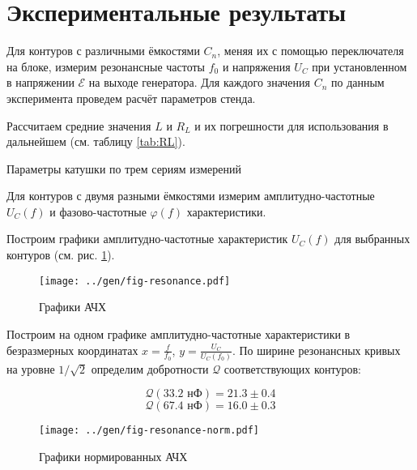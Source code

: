 \section*{Экспериментальные результаты}

Для контуров с различными ёмкостями $C_n$, меняя их с помощью переключателя на блоке, измерим резонансные частоты $f_0$ и напряжения $U_C$ при установленном в напряжении $\mathscr{E}$ на выходе генератора. Для каждого значения $C_n$ по данным эксперимента проведем расчёт параметров стенда.

Рассчитаем средние значения $L$ и $R_L$ и их погрешности для использования в дальнейшем (см. таблицу \ref{tab:RL}).

%	

\begin{table}[H]
	\centering
	\footnotesize

	
	
	
	
	
	
	\caption{Параметры катушки по трем сериям измерений}
	\label{tab:RL}
\end{table}

Для контуров с двумя разными ёмкостями измерим амплитудно-частотные $U_C(f)$ и  фазово-частотные $\varphi(f)$ характеристики.

Построим графики амплитудно-частотные характеристик $U_C(f)$ для выбранных контуров (см. рис. \ref{fig:resonance}).

\begin{figure}[h]
	\centering
	\texttt{[image: ../gen/fig-resonance.pdf]}
	\caption{Графики АЧХ}
	\label{fig:resonance}
\end{figure}

Построим на одном графике амплитудно-частотные характеристики в безразмерных координатах $x = \frac{f}{f_0}$, $y = \frac{U_C}{U_C(f_0)}$. По ширине резонансных кривых на уровне $1 / \sqrt{2}$
определим добротности $\mathcal{Q}$ соответствующих контуров:

$$\mathcal{Q}\left(33.2 \text{ нФ}\right) = 21.3 \pm 0.4$$
$$\mathcal{Q}\left(67.4 \text{ нФ}\right) = 16.0 \pm 0.3$$

\begin{figure}[H]
	\centering
	\texttt{[image: ../gen/fig-resonance-norm.pdf]}
	\caption{Графики нормированных АЧХ}
	\label{fig:norm}
\end{figure}


